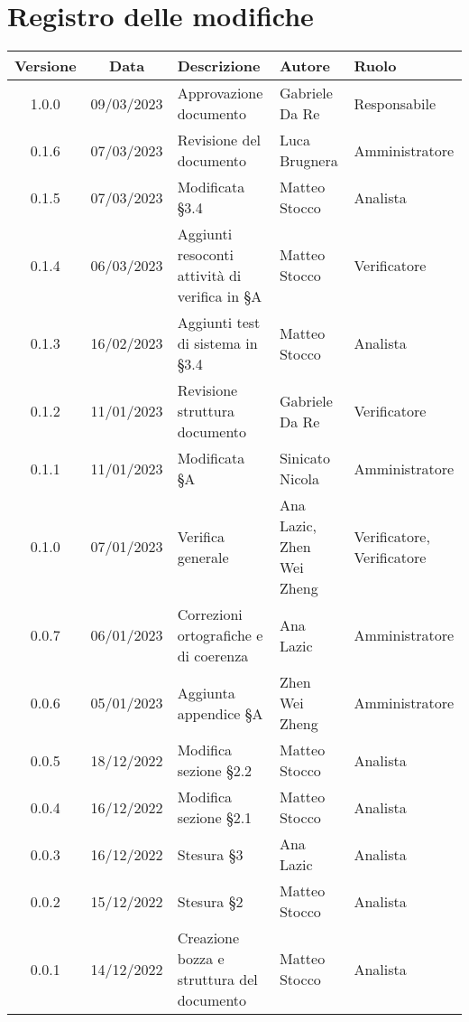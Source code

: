 \section*{Registro delle modifiche}
\begin{center}
\setlength\extrarowheight{5pt}
\renewcommand\tabularxcolumn[1]{>{\Centering}m{#1}}
\begin{tabularx}{\textwidth}{| c | c | X | X | X |} 
	\hline
	\rowcolor{white}
	\textbf{Versione} & \textbf{Data} & \textbf{Descrizione} & \textbf{Autore} & \textbf{Ruolo}\\
	\hline
	1.0.0 & 09/03/2023 & Approvazione documento & Gabriele Da Re & Responsabile \\
	\hline
	0.1.6 & 07/03/2023 & Revisione del documento & Luca Brugnera & Amministratore \\
	\hline
	0.1.5 & 07/03/2023 & Modificata §3.4 & Matteo Stocco & Analista \\
	\hline
	0.1.4 & 06/03/2023 & Aggiunti resoconti attività di verifica in §A & Matteo Stocco & Verificatore \\
    \hline
    0.1.3 & 16/02/2023 & Aggiunti test di sistema in §3.4 & Matteo Stocco & Analista \\
    \hline
	0.1.2 & 11/01/2023 & Revisione struttura documento & Gabriele Da Re & Verificatore \\
	\hline
	0.1.1 & 11/01/2023 & Modificata §A & Sinicato Nicola &Amministratore \\
    \hline
	0.1.0 & 07/01/2023 & Verifica generale & Ana Lazic, Zhen Wei Zheng & Verificatore, Verificatore \\
    \hline
	0.0.7 & 06/01/2023 & Correzioni ortografiche e di coerenza & Ana Lazic & Amministratore \\
	\hline
	0.0.6 & 05/01/2023 & Aggiunta appendice §A & Zhen Wei Zheng & Amministratore \\
	\hline
	0.0.5 & 18/12/2022 & Modifica sezione §2.2 & Matteo Stocco & Analista \\
	\hline
	0.0.4 & 16/12/2022 & Modifica sezione §2.1 & Matteo Stocco & Analista \\
     \hline
	0.0.3 & 16/12/2022 & Stesura §3 & Ana Lazic & Analista \\
	\hline
	0.0.2 & 15/12/2022 & Stesura §2 & Matteo Stocco & Analista \\
	\hline
	0.0.1 & 14/12/2022 & Creazione bozza e struttura del documento & Matteo Stocco & Analista \\
	\hline
	\end{tabularx}
\end{center}
